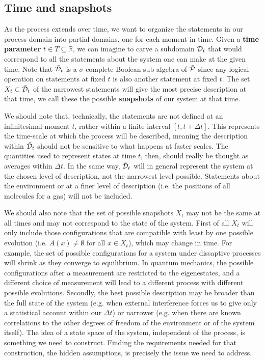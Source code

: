 \documentclass[letterpaper]{article}
\begin{document}
\subsection{Time and snapshots}

As the process extends over time, we want to organize the statements in our process domain into partial domains, one for each moment in time. Given a \textbf{time parameter} $t \in T \subseteq \mathbb{R}$, we can imagine to carve a subdomain $\tdomain_t$ that would correspond to all the statements about the system one can make at the given time. Note that $\tdomain_t$ is a $\sigma$-complete Boolean sub-algebra of $\tdomain[P]$ since any logical operation on statements at fixed $t$ is also another statement at fixed $t$. The set $X_t \subset \tdomain_t$ of the narrowest statements will give the most precise description at that time, we call these the  possible \textbf{snapshots} of our system at that time.

We should note that, technically, the statements are not defined at an infinitesimal moment $t$, rather within a finite interval $[t, t + \Delta t]$. This represents the time-scale at which the process will be described, meaning the description within $\tdomain_t$ should not be sensitive to what happens at faster scales. The quantities used to represent states at time $t$, then, should really be thought as averages within $\Delta t$. In the same way, $\tdomain_t$ will in general represent the system at the chosen level of description, not the narrowest level possible. Statements about the environment or at a finer level of description (i.e. the positions of all molecules for a gas) will not be included.

We should also note that the set of possible snapshots $X_t$ may not be the same at all times and may not correspond to the state of the system. First of all $X_t$ will only include those configurations that are compatible with least by one possible evolution (i.e. $A(x) \neq \emptyset$ for all $x \in X_t$), which may change in time. For example, the set of possible configurations for a system under dissaptive processes will shrink as they converge to equilibrium. In quantum mechanics, the possible configurations after a measurement are restricted to the eigenestates, and a different choice of measurement will lead to a different process with different possible evolutions. Secondly, the best possible description may be broader than the full state of the system (e.g. when external interference forces us to give only a statistical account within our $\Delta t$) or narrower (e.g. when there are known correlations to the other degrees of freedom of the environment or of the system itself). The idea of a state space of the system, independent of the process, is something we need to construct. Finding the requirements needed for that construction, the hidden assumptions, is precisely the issue we need to address.
\end{document}
